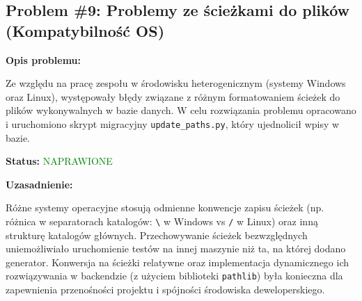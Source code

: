 \documentclass[12pt,a4paper]{article}
\begin{document}
\subsection{Problem \#9: Problemy ze ścieżkami do plików (Kompatybilność OS)}

\begin{tcolorbox}[colback=magenta!5!white,colframe=magenta!75!black,title=Problem Projektowy - Priorytet: WYSOKI]
\textbf{Opis problemu:}

Ze względu na pracę zespołu w środowisku heterogenicznym (systemy Windows oraz Linux), występowały błędy związane z różnym formatowaniem ścieżek do plików wykonywalnych w bazie danych. W celu rozwiązania problemu opracowano i uruchomiono skrypt migracyjny \texttt{update\_paths.py}, który ujednolicił wpisy w bazie.

\textbf{Status:} \textcolor{green}{NAPRAWIONE}

\textbf{Uzasadnienie:}

Różne systemy operacyjne stosują odmienne konwencje zapisu ścieżek (np. różnica w separatorach katalogów: \texttt{\textbackslash} w Windows vs \texttt{/} w Linux) oraz inną strukturę katalogów głównych. Przechowywanie ścieżek bezwzględnych uniemożliwiało uruchomienie testów na innej maszynie niż ta, na której dodano generator. Konwersja na ścieżki relatywne oraz implementacja dynamicznego ich rozwiązywania w backendzie (z użyciem biblioteki \texttt{pathlib}) była konieczna dla zapewnienia przenośności projektu i spójności środowiska deweloperskiego.
\end{tcolorbox}
\end{document}
